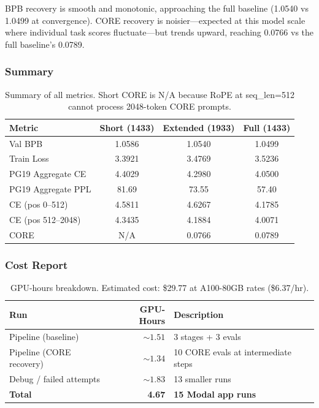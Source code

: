 BPB recovery is smooth and monotonic, approaching the full baseline (1.0540 vs 1.0499 at convergence). CORE recovery is noisier---expected at this model scale where individual task scores fluctuate---but trends upward, reaching 0.0766 vs the full baseline's 0.0789.

\subsubsection{Summary}

\begin{table}[H]
\centering\small
\begin{tabular}{@{}lccc@{}}
\toprule
Metric & Short (1433) & Extended (1933) & Full (1433) \\
\midrule
Val BPB & 1.0586 & 1.0540 & 1.0499 \\
Train Loss & 3.3921 & 3.4769 & 3.5236 \\
PG19 Aggregate CE & 4.4029 & 4.2980 & 4.0500 \\
PG19 Aggregate PPL & 81.69 & 73.55 & 57.40 \\
CE (pos 0--512) & 4.5811 & 4.6267 & 4.1785 \\
CE (pos 512--2048) & 4.3435 & 4.1884 & 4.0071 \\
CORE & N/A & 0.0766 & 0.0789 \\
\bottomrule
\end{tabular}
\caption{Summary of all metrics. Short CORE is N/A because RoPE at seq\_len=512 cannot process 2048-token CORE prompts.}
\label{tab:summary}
\end{table}

\subsubsection{Cost Report}

\begin{table}[H]
\centering\small
\begin{tabular}{@{}lrl@{}}
\toprule
Run & GPU-Hours & Description \\
\midrule
Pipeline (baseline) & ${\sim}1.51$ & 3 stages + 3 evals \\
Pipeline (CORE recovery) & ${\sim}1.34$ & 10 CORE evals at intermediate steps \\
Debug / failed attempts & ${\sim}1.83$ & 13 smaller runs \\
\midrule
\textbf{Total} & \textbf{4.67} & \textbf{15 Modal app runs} \\
\bottomrule
\end{tabular}
\caption{GPU-hours breakdown. Estimated cost: \$29.77 at A100-80GB rates (\$6.37/hr).}
\label{tab:cost}
\end{table}

